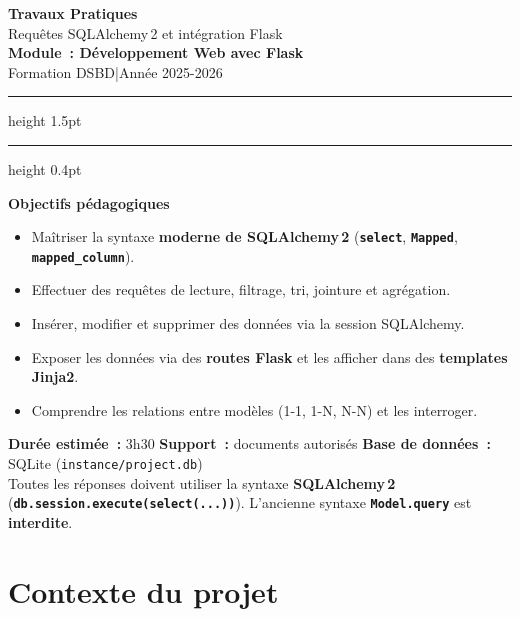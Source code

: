 \documentclass[12pt,a4paper]{article}
\newcommand{\fichier}[1]{\texttt{\textcolor{primary}{#1}}}
\newcommand{\kw}[1]{\texttt{\textbf{#1}}}
\begin{document}
\begin{center}
    {\LARGE\bfseries\color{primary} Travaux Pratiques}\\[6pt]
    {\large Requêtes SQLAlchemy\,2 et intégration Flask}\\[4pt]
    {\large\bfseries Module~: Développement Web avec Flask}\\[2pt]
    {\normalsize Formation DSBD\quad|\quad Année 2025-2026}\\[12pt]
    \hrule height 1.5pt
    \vspace{4pt}
    \hrule height 0.4pt
\end{center}

\vspace{6pt}

\begin{mdframed}[style=objectif]
\textbf{\textcolor{primary}{Objectifs pédagogiques}}
\begin{itemize}[noitemsep]
    \item Maîtriser la syntaxe \textbf{moderne de SQLAlchemy\,2} (\kw{select}, \kw{Mapped}, \kw{mapped\_column}).
    \item Effectuer des requêtes de lecture, filtrage, tri, jointure et agrégation.
    \item Insérer, modifier et supprimer des données via la session SQLAlchemy.
    \item Exposer les données via des \textbf{routes Flask} et les afficher dans des \textbf{templates Jinja2}.
    \item Comprendre les relations entre modèles (1-1, 1-N, N-N) et les interroger.
\end{itemize}
\end{mdframed}

\vspace{4pt}

\begin{mdframed}[style=attention]
\textbf{Durée estimée~:} 3h30\quad
\textbf{Support~:} documents autorisés\quad
\textbf{Base de données~:} SQLite (\fichier{instance/project.db})\\
Toutes les réponses doivent utiliser la syntaxe \textbf{SQLAlchemy\,2} (\kw{db.session.execute(select(...))}).
L'ancienne syntaxe \kw{Model.query} est \textcolor{accent}{\textbf{interdite}}.
\end{mdframed}

\section{Contexte du projet}
\end{document}
